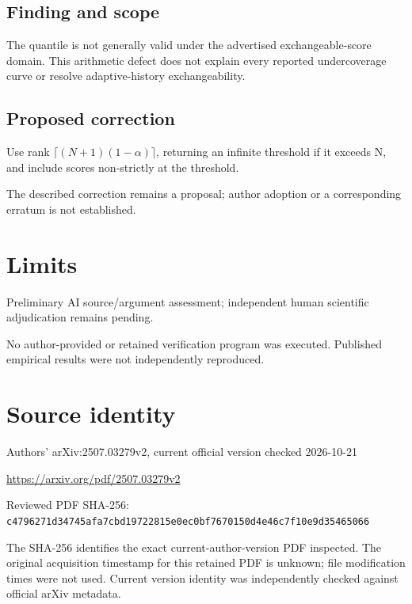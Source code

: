 \documentclass[11pt]{article}
\begin{document}
\subsection*{Finding and scope}

The quantile is not generally valid under the advertised exchangeable-score domain. This arithmetic defect does not explain every reported undercoverage curve or resolve adaptive-history exchangeability.

\subsection*{Proposed correction}

Use rank \(\lceil(N+1)(1-\alpha)\rceil\), returning an infinite threshold if it exceeds N, and include scores non-strictly at the threshold.

The described correction remains a proposal; author adoption or a corresponding erratum is not established.

\section*{Limits}

Preliminary AI source/argument assessment; independent human scientific adjudication remains pending.\par

No author-provided or retained verification program was executed. Published empirical results were not independently reproduced.\par

\section*{Source identity}

Authors’ arXiv:2507.03279v2, current official version checked 2026-10-21

\url{https://arxiv.org/pdf/2507.03279v2}

Reviewed PDF SHA-256: \nolinkurl{c4796271d34745afa7cbd19722815e0ec0bf7670150d4e46c7f10e9d35465066}

The SHA-256 identifies the exact current-author-version PDF inspected. The original acquisition timestamp for this retained PDF is unknown; file modification times were not used. Current version identity was independently checked against official arXiv metadata.
\end{document}
